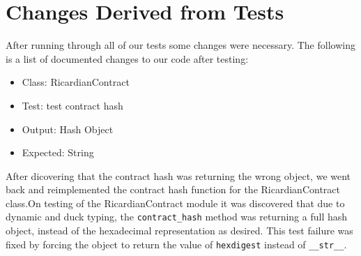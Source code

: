 \documentclass{article}
\begin{document}
\section{Changes Derived from Tests}
After running through all of our tests some changes were necessary. The following is a list of documented changes to our code after testing:\newline
\newline
\begin{itemize}
\item Class: RicardianContract
\item Test: test contract hash
\item Output: Hash Object
\item Expected: String
\end{itemize} 
After dicovering that the contract hash was returning the wrong object, we went back and reimplemented the contract hash function for the RicardianContract class.On testing of the RicardianContract module it was discovered that due to dynamic and duck typing, the \texttt{contract\_hash} method was returning a full hash object, instead of the hexadecimal representation as desired. This test failure was fixed by forcing the object to return the value of \texttt{hexdigest} instead of \texttt{\_\_str\_\_}.



\end{document}
